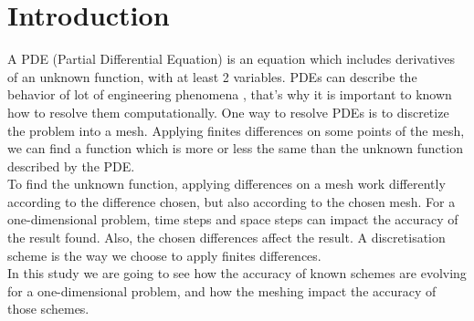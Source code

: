 \documentclass{article}
\begin{document}
        \section{Introduction}
    
        A PDE (Partial Differential Equation) is an equation which includes derivatives of an unknown function, with at least 2 variables.
        PDEs can describe the behavior of lot of engineering phenomena \cite{pde}, that's why it is important to 
        known how to resolve them computationally. One way to resolve PDEs is to discretize the problem into
        a mesh. Applying finites differences on some points of the mesh, we can find a function
        which is more or less the same than the unknown function described by the PDE.
        \\
        To find the unknown function, applying differences on a mesh work differently according to the difference chosen, 
        but also according to the chosen mesh. For a one-dimensional problem, time steps and space steps can impact the accuracy
        of the result found. Also, the chosen differences affect the result. A discretisation scheme is the way we choose to apply
        finites differences.
        \\
        In this study we are going to see how the accuracy of known schemes are evolving for a one-dimensional problem, and how the 
        meshing impact the accuracy of those schemes.
        
        
    
    
        \newpage
\end{document}
